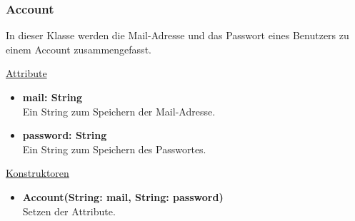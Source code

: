\newpage
\subsubsection{Account}\label{Account}
In dieser Klasse werden die Mail-Adresse und das Passwort eines Benutzers zu einem Account zusammengefasst. \newline

\underline{Attribute}
\begin{itemize}
\itemsep0pt
\item \textbf{mail: String} \hfill\\ 
Ein String zum Speichern der Mail-Adresse.

\item \textbf{password: String} \hfill\\ 
Ein String zum Speichern des Passwortes.

\end{itemize}

\underline{Konstruktoren}
\begin{itemize}
\itemsep0pt
\item \textbf{Account(String: mail, String: password)} \hfill\\
Setzen der Attribute.
\end{itemize}
